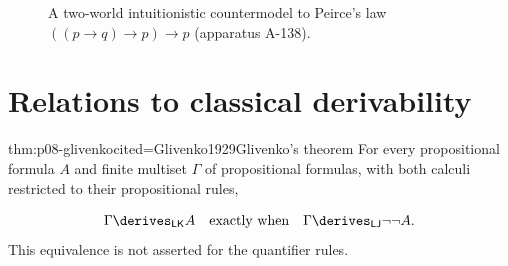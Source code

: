 \begin{figure}[!htbp]
\centering
{}
\caption{A two-world intuitionistic countermodel to Peirce's law
  \(((p\to q)\to p)\to p\) (apparatus A-138).}
\label{fig:p08-ipl-peirce}
\end{figure}

\section{Relations to classical derivability}

\begin{hbtheorem}{thm:p08-glivenko}{cited=Glivenko1929}{Glivenko's theorem}
For every propositional formula \(A\) and finite multiset \(\Gamma\) of
propositional formulas, with both calculi restricted to their propositional
rules,

\[
  \Gamma\derives_{\mathsf{LK}}A
  \quad\text{exactly when}\quad
  \Gamma\derives_{\mathsf{LJ}}\neg\neg A.
\]
This equivalence is not asserted for the quantifier rules.
\end{hbtheorem}

